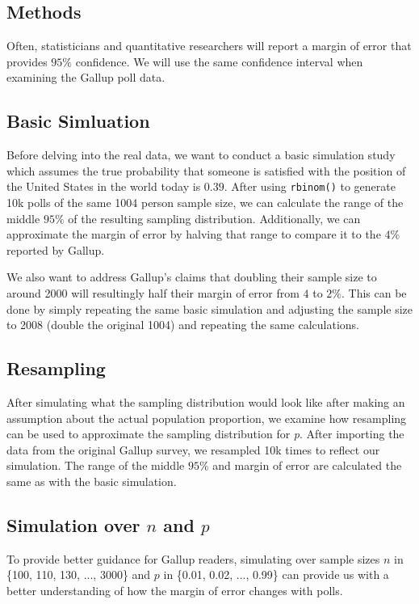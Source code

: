 \documentclass{article}\usepackage[]{graphicx}\usepackage[]{xcolor}
\begin{document}
\begin{multicols}{2}
\section{Methods}
Often, statisticians and quantitative researchers will report a margin of error that provides $95\%$ confidence. We will use the same confidence interval when examining the Gallup poll data.

\subsection{Basic Simluation}
Before delving into the real data, we want to conduct a basic simulation study which assumes the true probability that someone is satisfied with the position of the United States in the world today is $0.39$. After using \texttt{rbinom()} to generate 10k polls of the same 1004 person sample size, we can calculate the range of the middle $95\%$ of the resulting sampling distribution. Additionally, we can approximate the margin of error by halving that range to compare it to the $4\%$ reported by Gallup.

We also want to address Gallup's claims that doubling their sample size to around 2000 will resultingly half their margin of error from $4$ to $2\%$. This can be done by simply repeating the same basic simulation and adjusting the sample size to 2008 (double the original 1004) and repeating the same calculations.

\subsection{Resampling}
After simulating what the sampling distribution would look like after making an assumption about the actual population proportion, we examine how resampling can be used to approximate the sampling distribution for \emph{p}. After importing the data from the original Gallup survey, we resampled 10k times to reflect our simulation. The range of the middle $95\%$ and margin of error are calculated the same as with the basic simulation. 

\subsection{Simulation over $n$ and $p$}
To provide better guidance for Gallup readers, simulating over sample sizes $n$ in \{100, 110, 130, ..., 3000\} and $p$ in \{0.01, 0.02, ..., 0.99\} can provide us with a better understanding of how the margin of error changes with polls. 


\end{multicols}
\end{document}
